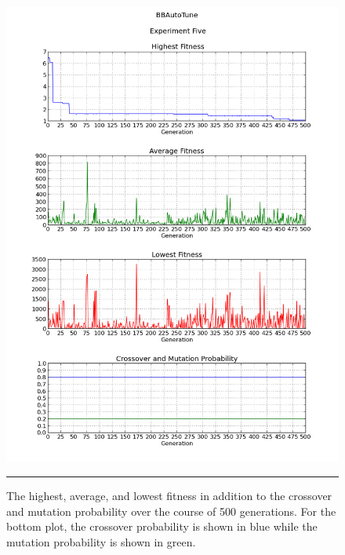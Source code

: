 \begin{figure}[htbp]
\centering
\includegraphics[width=5in]{../Figures/Chapter4/exp5_halcm.png}
\rule{35em}{0.5pt}
\caption[Experiment Five GA Metrics]{The highest, average, and lowest fitness in addition to the crossover and mutation probability over the course of 500 generations. For the bottom plot, the crossover probability is shown in blue while the mutation probability is shown in green.}
\label{fig:exp5_halcm}
\end{figure}

